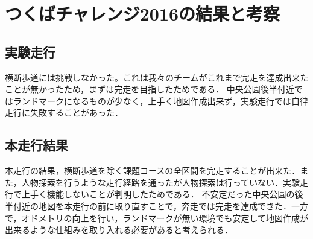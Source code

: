 \documentclass[10pt,a4paper]{jarticle}
\begin{document}
\section{つくばチャレンジ2016の結果と考察}
\subsection{実験走行}
横断歩道には挑戦しなかった。これは我々のチームがこれまで完走を達成出来たことが無かったため，まずは完走を目指したためである．
中央公園後半付近ではランドマークになるものが少なく，上手く地図作成出来ず，実験走行では自律走行に失敗することがあった．

\subsection{本走行結果}
本走行の結果，横断歩道を除く課題コースの全区間を完走することが出来た．また，人物探索を行うような走行経路を通ったが人物探索は行っていない．実験走行で上手く機能しないことが判明したためである．
不安定だった中央公園の後半付近の地図を本走行の前に取り直すことで，奔走では完走を達成できた．一方で，オドメトリの向上を行い，ランドマークが無い環境でも安定して地図作成が出来るような仕組みを取り入れる必要があると考えられる．
\end{document}
